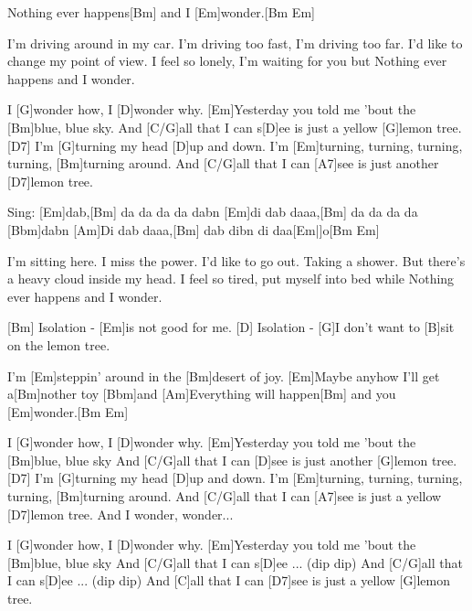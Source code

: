 \begin{guitar}
	[Am]Nothing ever happens[Bm] and I [Em]wonder.[Bm Em]{}
	
	I'm driving around in my car.
	I'm driving too fast, I'm driving too far.
	I'd like to change my point of view.
	I feel so lonely, I'm waiting for you but
	Nothing ever happens and I wonder.
	
	I [G]wonder how, I [D]wonder why. 
	[Em]Yesterday you told me 'bout the [Bm]blue, blue sky.
	And [C/G]all that I can s[D]ee is just a yellow [G]lemon tree.[D7]{}
	I'm [G]turning my head [D]up and down.
	I'm [Em]turning, turning, turning, turning, [Bm]turning around.
	And [C/G]all that I can [A7]see is just another [D7]lemon tree.
	
	Sing: [Em]dab,[Bm] da da da da dabn [Em]di dab daaa,[Bm] da da da da [Bbm]dabn
	 [Am]Di dab daaa,[Bm] dab dibn di daa[Em|]o[Bm Em]{}
	
	I'm sitting here. I miss the power.
	I'd like to go out. Taking a shower.
	But there's a heavy cloud inside my head.
	I feel so tired, put myself into bed while
	Nothing ever happens and I wonder.
	
	[Bm] Isolation - [Em]is not good for me.
	[D] Isolation - [G]I don't want to [B]sit on the lemon tree.
	
	I'm [Em]steppin' around in the [Bm]desert of joy.
	[Em]Maybe anyhow I'll get a[Bm]nother toy [Bbm]and
	[Am]Everything will happen[Bm] and you [Em]wonder.[Bm Em]{}
	
	I [G]wonder how, I [D]wonder why. 
	[Em]Yesterday you told me 'bout the [Bm]blue, blue sky
	And [C/G]all that I can [D]see is just another [G]lemon tree.[D7]{}
	I'm [G]turning my head [D]up and down.
	I'm [Em]turning, turning, turning, turning, [Bm]turning around.
	And [C/G]all that I can [A7]see is just a yellow [D7]lemon tree. And I wonder, wonder...
	
	I [G]wonder how, I [D]wonder why. 
	[Em]Yesterday you told me 'bout the [Bm]blue, blue sky
	And [C/G]all that I can s[D]ee ... (dip dip)
	And [C/G]all that I can s[D]ee ... (dip dip)
	And [C]all that I can [D7]see is just a yellow [G]lemon tree.
\end{guitar}